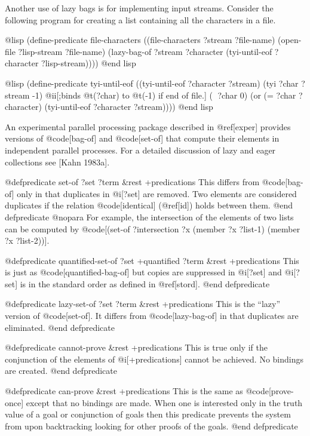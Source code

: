 {Another use of lazy bags is for implementing input streams.
Consider the following program for creating a list containing all the
characters in a file.

@lisp
(define-predicate file-characters
  ((file-characters ?stream ?file-name)
   (open-file ?lisp-stream ?file-name)
   (lazy-bag-of ?stream
                ?character
                (tyi-until-eof ?character ?lisp-stream))))
@end lisp

@lisp
(define-predicate tyi-until-eof
  ((tyi-until-eof ?character ?stream)
   (tyi ?char ?stream -1) @ii[;binds @t(?char) to @t(-1) if end of file.]
   ( ?char 0)
   (or (= ?char ?character) (tyi-until-eof ?character ?stream))))
@end lisp

An experimental parallel processing package described in @ref[exper] provides
versions of @code[bag-of] and @code[set-of]
that compute their elements in independent parallel processes.
For a detailed discussion of lazy and eager collections see [Kahn 1983a].

@defpredicate set-of ?set ?term &rest +predications
This differs from @code[bag-of]
only in that duplicates in @i[?set] are removed.
Two elements are considered duplicates if the relation @code[identical] 
(@ref[id]) holds between them.
@end defpredicate
@nopara
For example, the intersection of the elements of two lists can be computed by 
@code[(set-of ?intersection ?x (member ?x ?list-1) (member ?x ?list-2))].

@defpredicate quantified-set-of ?set +quantified ?term &rest +predications
This is just as @code[quantified-bag-of] but copies are suppressed in @i[?set] and
@i[?set] is in the standard order as defined in @ref[stord].
@end defpredicate

@defpredicate lazy-set-of ?set ?term &rest +predications
This is the ``lazy'' version of @code[set-of].
It differs from @code[lazy-bag-of] in that duplicates are eliminated.
@end defpredicate

@defpredicate cannot-prove &rest +predications
This is true only if the conjunction
of the elements of @i[+predications] cannot be achieved.
No bindings are created.
@end defpredicate


@defpredicate can-prove &rest +predications
This is the same as @code[prove-once] except that no bindings are made.
When one is interested only in the truth value of a goal or conjunction 
of goals then this predicate prevents the system from upon backtracking 
looking for other proofs of the goals.
@end defpredicate

}
